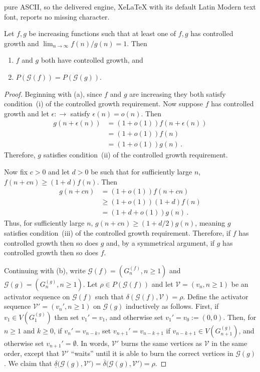 \documentclass[10pt,a4paper]{amsart}
\newcommand\cG{\mathcal G}
\newcommand\cV{\mathcal V}
\providecommand{\N}{}
\begin{document}
pure ASCII, so the delivered engine, XeLaTeX with its default Latin Modern text font, reports no missing character.
\begin{lemma}\label{lem:f,g same densities}
Let $f,g$ be increasing functions such that at least one of $f,g$ has controlled growth and $\lim_{n \to \infty} f(n)/g(n) = 1$. Then 
\begin{enumerate}
\item[(a)] $f$ and $g$ both have controlled growth, and
\item[(b)] $P(\cG(f)) = P(\cG(g))$. 
\end{enumerate}
\end{lemma}

\begin{proof}
Beginning with (a), since $f$ and $g$ are increasing they both satisfy condition~(i) of the controlled growth requirement. Now suppose $f$ has controlled growth and let $\epsilon: \N \to \N$ satisfy $\epsilon
(n) = o(n)$. Then
\begin{align*}
g(n+\epsilon(n)) 
&= 
(1+o(1)) f(n+\epsilon(n))\\
&=
(1+o(1)) f(n)\\
&=
(1+o(1)) g(n) \,.
\end{align*}
Therefore, $g$ satisfies condition~(ii) of the controlled growth requirement. 

Now fix $c > 0$ and let $d > 0$ be such that for sufficiently large $n$, $f(n+cn) \geq (1+d)f(n)$. Then
\begin{align*}
g(n+cn) 
&= 
(1+o(1)) f(n+cn)\\
&\geq 
(1+o(1)) (1+d)f(n)\\
&=
(1+d+o(1))g(n) \,.
\end{align*}
Thus, for sufficiently large $n$, $g(n+cn) \geq (1+d/2) g(n)$, meaning $g$ satisfies condition~(iii) of the controlled growth requirement. Therefore, if $f$ has controlled growth then so does $g$ and, by a symmetrical argument, if $g$ has controlled growth then so does $f$. 

Continuing with (b), write $\cG(f) = (G^{(f)}_n,n \geq 1)$ and $\cG(g) = (G^{(g)}_n,n \geq 1)$. Let $\rho \in P(\cG(f))$ and let $\cV = (v_n,n\geq 1)$ be an activator sequence on $\cG(f)$ such that $\delta(\cG(f),\cV) = \rho$. Define the activator sequence $\cV' = (v_n', n \geq 1)$ on $\cG(g)$ inductively as follows. First, if $v_1 \in V(G^{(g)}_1)$ then set $v_1'=v_1$, and otherwise set $v_1' = v_0 := (0,0)$. Then, for $n \geq 1$ and $k \geq 0$, if $v_n' = v_{n-k}$, set $v_{n+1}' = v_{n-k+1}$ if $v_{n-k+1} \in V(G^{(g)}_{n+1})$, and otherwise set $v_{n+1}' = \emptyset$. In words, $\cV'$ burns the same vertices as $\cV$ in the same order, except that $\cV'$ ``waits'' until it is able to burn the correct vertices in $\cG(g)$. We claim that $\underline{\delta}\big( \cG(g), \cV' \big) = \overline{\delta}\big( \cG(g), \cV' \big) = \rho$. 


\end{proof}
\end{document}
